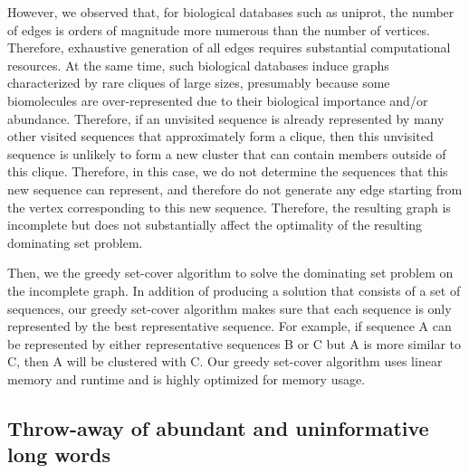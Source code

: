 \documentclass[]{article}
\begin{document}
However, we observed that, for biological databases such as uniprot, the number of edges is orders of magnitude more numerous than the number of vertices. Therefore, exhaustive generation of all edges requires substantial computational resources.
At the same time, such biological databases induce graphs characterized by rare cliques of large sizes, presumably because some biomolecules are over-represented due to their biological importance and/or abundance.
Therefore, if an unvisited sequence is already represented by many other visited sequences that approximately form a clique, then this unvisited sequence is unlikely to form a new cluster that can contain members outside of this clique. 
Therefore, in this case, we do not determine the sequences that this new sequence can represent, and therefore do not generate any edge starting from the vertex corresponding to this new sequence. 
Therefore, the resulting graph is incomplete but does not substantially affect the optimality of the resulting dominating set problem.

Then, we the greedy set-cover algorithm to solve the dominating set problem on the incomplete graph.
In addition of producing a solution that consists of a set of sequences, 
	our greedy set-cover algorithm makes sure that each sequence is only represented by the best representative sequence.
For example, if sequence A can be represented by either representative sequences B or C but A is more similar to C,
	then A will be clustered with C.  
Our greedy set-cover algorithm uses linear memory and runtime and is highly optimized for memory usage.


\subsection{Throw-away of abundant and uninformative long words}
\end{document}
